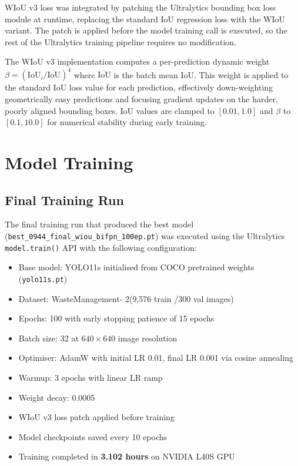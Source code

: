 WIoU v3 loss was integrated by patching the Ultralytics bounding box loss module at runtime, replacing the standard IoU regression loss with the WIoU variant. The patch is applied before the model training call is executed, so the rest of the Ultralytics training pipeline requires no modification.

The WIoU v3 implementation computes a per-prediction dynamic weight $\beta = (\text{IoU}_i / \overline{\text{IoU}})^4$ where $\overline{\text{IoU}}$ is the batch mean IoU. This weight is applied to the standard IoU loss value for each prediction, effectively down-weighting geometrically easy predictions and focusing gradient updates on the harder, poorly aligned bounding boxes. IoU values are clamped to $[0.01, 1.0]$ and $\beta$ to $[0.1, 10.0]$ for numerical stability during early training.

\section{Model Training}

\subsection{Final Training Run}

The final training run that produced the best model (\texttt{best\_0944\_final\_wiou\_bifpn\_100ep.pt}) was executed using the Ultralytics \texttt{model.train()} API with the following configuration:

\begin{itemize}
    \item Base model: YOLO11s initialised from COCO pretrained weights (\texttt{yolo11s.pt})
    \item Dataset: WasteManagement- 2(9,576 train /300 val images)
    \item Epochs: 100 with early stopping patience of 15 epochs
    \item Batch size: 32 at $640\times640$ image resolution
    \item Optimiser: AdamW with initial LR 0.01, final LR 0.001 via cosine annealing
    \item Warmup: 3 epochs with linear LR ramp
    \item Weight decay: 0.0005
    \item WIoU v3 loss patch applied before training
    \item Model checkpoints saved every 10 epochs
    \item Training completed in \textbf{3.102 hours} on NVIDIA L40S GPU
\end{itemize}

